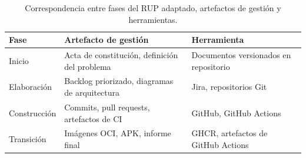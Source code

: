\begin{table}[ht]
\centering
\caption{Correspondencia entre fases del RUP adaptado, artefactos de gestión y herramientas.}
\label{tab:gestion-rup}
\footnotesize
\begin{tabular}{@{}p{1.8cm}p{2.8cm}p{2.5cm}@{}}
\toprule
\textbf{Fase} & \textbf{Artefacto de gestión} & \textbf{Herramienta} \\
\midrule
Inicio & Acta de constitución, definición del problema & Documentos versionados en repositorio \\[3pt]
Elaboración & Backlog priorizado, diagramas de arquitectura & Jira, repositorios Git \\[3pt]
Construcción & Commits, pull requests, artefactos de CI & GitHub, GitHub Actions \\[3pt]
Transición & Imágenes OCI, APK, informe final & GHCR, artefactos de GitHub Actions \\
\bottomrule
\end{tabular}
\end{table}